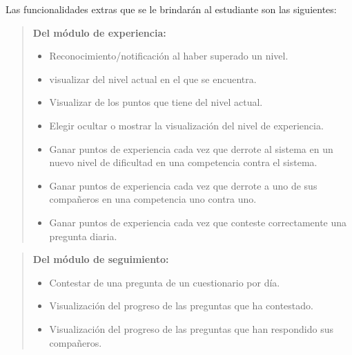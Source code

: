     \noindent
    Las funcionalidades extras que se le brindarán al estudiante son las siguientes:

    \begin{quote}
    {\bf Del módulo de experiencia:}
        \begin{itemize}
        \item Reconocimiento/notificación al haber superado un nivel.
        \item visualizar del nivel actual en el que se encuentra.
        \item Visualizar de los puntos que tiene del nivel actual.
        \item Elegir ocultar o mostrar la visualización del nivel de experiencia.

        \item Ganar puntos de experiencia cada vez que derrote al sistema en un
              nuevo nivel de dificultad en una competencia contra el sistema.

        \item Ganar puntos de experiencia cada vez que derrote a uno
              de sus compañeros en una competencia uno contra uno.

        \item Ganar puntos de experiencia cada vez que conteste correctamente
              una pregunta diaria.
        \end{itemize}
    \end{quote}

    \begin{quote}
    {\bf Del módulo de seguimiento:}
        \begin{itemize}
        \item Contestar de una pregunta de un cuestionario por día.
        \item Visualización del progreso de las preguntas que ha contestado.
        \item Visualización del progreso de las preguntas que han respondido sus compañeros.
        \end{itemize}
    \end{quote}


